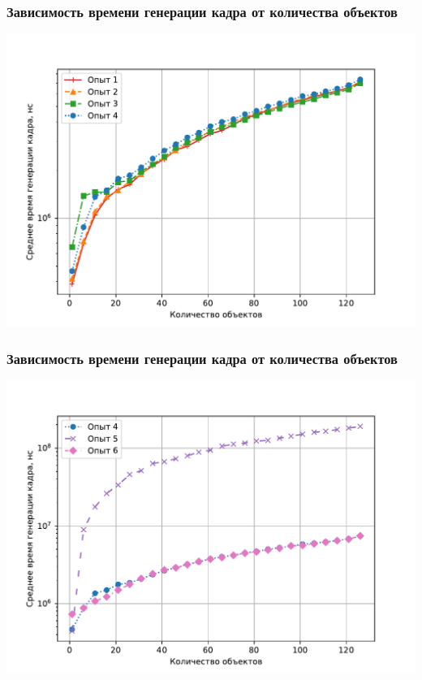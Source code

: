 \documentclass{beamer}
\begin{document}
\begin{frame}
\frametitle{Зависимость времени генерации кадра от количества объектов}
\centering
\includegraphics[width=1\textwidth]{img/1234/plot_time.pdf}
\end{frame}

\begin{frame}
\frametitle{Зависимость времени генерации кадра от количества объектов}
\centering
\includegraphics[width=1\textwidth]{img/456/plot_time.pdf}
\end{frame}
\end{document}
